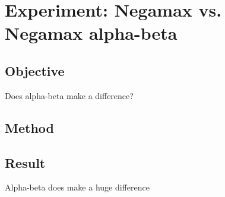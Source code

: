 


\section{Experiment: Negamax vs. Negamax alpha-beta}
\subsection*{Objective}
Does alpha-beta make a difference?
\subsection*{Method}
\subsection*{Result}

Alpha-beta does make a huge difference

